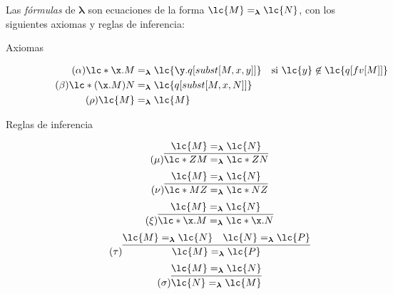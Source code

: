 \begin{defi} Las \emph{fórmulas} de \(\boldsymbol{\lambda}\) son ecuaciones de
  la forma \(\lc{M}=_{\boldsymbol{\lambda}}\lc{N}\), con los siguientes axiomas
  y reglas de inferencia:
  \label{definicion:teorialambda}
  \begin{description}
  \item[Axiomas]
    \begin{subequations}
      \begin{align}
        \label{definicion:teorialambda:alpha} \tag{\ensuremath{\alpha}}
        \lc*{\x.M}&=_{\boldsymbol{\lambda}}\lc{\y.q[subst[M,x,y]]} & &\text{si } \lc{y} \not\in \lc{q[fv[M]]}
        \\
        \label{definicion:teorialambda:beta} \tag{\ensuremath{\beta}}
        \lc*{(\x.M)N}&=_{\boldsymbol{\lambda}}\lc{q[subst[M,x,N]]}
        \\
        \label{definicion:teorialambda:rho} \tag{\ensuremath{\rho}}
        \lc{M}&=_{\boldsymbol{\lambda}}\lc{M}
      \end{align}
    \end{subequations}
  \item[Reglas de inferencia]
    \begin{equation}
      \label{definicion:teorialambda:mu} \tag{\ensuremath{\mu}}
      \infer{\lc*{Z M}=_{\boldsymbol{\lambda}}\lc*{Z N}}{\lc{M}=_{\boldsymbol{\lambda}}\lc{N}}
    \end{equation}
    \begin{equation}
      \label{definicion:teorialambda:nu} \tag{\ensuremath{\nu}}
        \infer{\lc*{M Z}=_{\boldsymbol{\lambda}}\lc*{N Z}}{\lc{M}=_{\boldsymbol{\lambda}}\lc{N}}
    \end{equation}
    \begin{equation}
      \label{definicion:teorialambda:xi} \tag{\ensuremath{\xi}}
      \infer{\lc*{\x.M}=_{\boldsymbol{\lambda}}\lc*{\x.N}}{\lc{M}=_{\boldsymbol{\lambda}}\lc{N}}
    \end{equation}
    \begin{equation}
      \label{definicion:teorialambda:tau} \tag{\ensuremath{\tau}}
        \infer{\lc{M}=_{\boldsymbol{\lambda}}\lc{P}}{\lc{M}=_{\boldsymbol{\lambda}}\lc{N} & \lc{N}=_{\boldsymbol{\lambda}}\lc{P}}
    \end{equation}
    \begin{equation}
      \label{definicion:teorialambda:sigma} \tag{\ensuremath{\sigma}}
      \infer{\lc{N}=_{\boldsymbol{\lambda}}\lc{M}}{\lc{M}=_{\boldsymbol{\lambda}}\lc{N}}
    \end{equation}
  \end{description}
\end{defi} \

